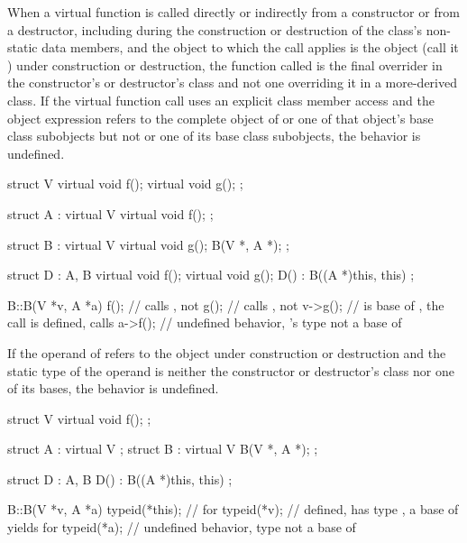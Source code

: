 
\pnum
When a virtual function is called directly or indirectly
from a constructor or from a destructor,
including during the construction or destruction
of the class's non-static data members,
and the object to which the call applies
is the object (call it ) under construction or destruction,
the function called is the final overrider in the constructor's or destructor's class
and not one overriding it in a more-derived class.
If the virtual function call uses an explicit class member access
and the object expression refers to the complete object of 
or one of that object's base class subobjects
but not  or one of its base class subobjects,
the behavior is undefined.

\pnum
\begin{example}
\begin{codeblock}
struct V {
  virtual void f();
  virtual void g();
};

struct A : virtual V {
  virtual void f();
};

struct B : virtual V {
  virtual void g();
  B(V *, A *);
};

struct D : A, B {
  virtual void f();
  virtual void g();
  D() : B((A *)this, this) {}
};

B::B(V *v, A *a) {
  f();          // calls , not 
  g();          // calls , not 
  v->g();       //  is base of , the call is defined, calls 
  a->f();       // undefined behavior, 's type not a base of 
}
\end{codeblock}
\end{example}


\pnum
If the operand of  refers to
the object under construction or destruction and the static type of the operand is neither the constructor or
destructor's class nor one of its bases, the behavior is undefined.

\pnum
\begin{example}
\begin{codeblock}
struct V {
  virtual void f();
};

struct A : virtual V {};
struct B : virtual V {
  B(V *, A *);
};

struct D : A, B {
  D() : B((A *)this, this) {}
};

B::B(V *v, A *a) {
  typeid(*this);        //  for 
  typeid(*v);           // defined,  has type , a base of  yields  for 
  typeid(*a);           // undefined behavior, type  not a base of 
}
\end{codeblock}
\end{example}

